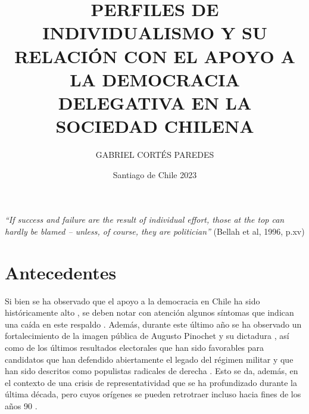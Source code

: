 \documentclass[12pt,twoside]{templates/facsothesis}
\title{PERFILES DE INDIVIDUALISMO Y SU RELACIÓN CON EL APOYO A LA DEMOCRACIA DELEGATIVA EN LA SOCIEDAD CHILENA}
\author{GABRIEL CORTÉS PAREDES}
\date{Santiago de Chile 2023}
\begin{document}
\raggedbottom

  \maketitle

\frontmatter %
 \pagestyle{empty} 


  \begin{prefacio}
  \thispagestyle{empty}
    \emph{``If success and failure are the result of individual effort, those at the top can hardly be blamed -- unless, of course, they are politician''} (Bellah et al, 1996, p.xv)
  \end{prefacio}

  \setcounter{tocdepth}{1}
  \setlength{\parskip}{0pt}
  \tableofcontents
  \thispagestyle{empty}

\setlength\parskip{1em plus 0.1em minus 0.2em}

  \listoftables
  \thispagestyle{empty}

  \listoffigures
  \thispagestyle{empty}



\mainmatter %
\titleformat{\chapter}{\normalfont\Huge\bfseries}{\thechapter}{1em}{}
\pagestyle{fancyplain} %

\hypertarget{antecedentes}{%
\chapter{Antecedentes}\label{antecedentes}}

Si bien se ha observado que el apoyo a la democracia en Chile ha sido históricamente alto \citep{navia2019}, se deben notar con atención algunos síntomas que indican una caída en este respaldo \citep{cep}. Además, durante este último año se ha observado un fortalecimiento de la imagen pública de Augusto Pinochet y su dictadura \citep{cadem2023, cerc-mori}, así como de los últimos resultados electorales que han sido favorables para candidatos que han defendido abiertamente el legado del régimen militar y que han sido descritos como populistas radicales de derecha \citep{diaz2023}. Esto se da, además, en el contexto de una crisis de representatividad que se ha profundizado durante la última década, pero cuyos orígenes se pueden retrotraer incluso hacia fines de los años 90 \citep{luna2016}.
\end{document}
